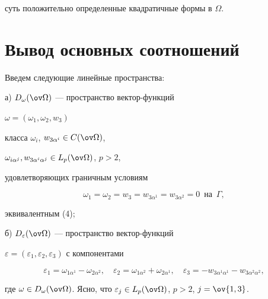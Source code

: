 суть положительно определенные квадратичные формы в $\Omega$.


 


\section{Вывод основных соотношений} 


 


Введем следующие линейные пространства: 


 


а) $D_\omega(\ov\Omega)$ --- пространство вектор-функций 


$\omega=(\omega_1,\omega_2,w_3)$ 


класса $\omega_i$, $w_{3\alpha^i}\in C(\ov\Omega)$, 


$\omega_{i\alpha^j},w_{3\alpha^i\alpha^j}\in L_p(\ov\Omega)$, $p>2$, 


удовлетворяющих граничным условиям 


\begin{equation} 


\omega_1=\omega_2=w_3=w_{3\alpha^1}=w_{3\alpha^2}=0\ \; 


\text{на} \ \; \Gamma, 


\end{equation} 


эквивалентным (4); 


 


б) $D_\varepsilon(\ov\Omega)$ --- пространство вектор-функций 


$\varepsilon=(\varepsilon_1,\varepsilon_2,\varepsilon_3)$ с компонентами 


\begin{equation} 


\varepsilon_1=\omega_{1\alpha^1}-\omega_{2\alpha^2},\quad 


\varepsilon_2=\omega_{1\alpha^2}+\omega_{2\alpha^1},\quad 


\varepsilon_3=-w_{3\alpha^1\alpha^1}-w_{3\alpha^2\alpha^2}, 


\end{equation} 


где $\omega\in D_\omega(\ov\Omega)$. Ясно, что $\varepsilon_j\in 


L_p(\ov\Omega)$, $p>2$, $j=\ov{1,3}$. 


